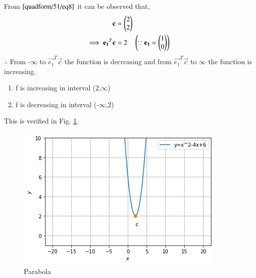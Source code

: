 From $\eqref{quadform/51/eq8}$ it can be observed that,
\begin{align}
\mathbf{c} &= \begin{pmatrix}2 \\ 2\end{pmatrix}
\\
\implies \mathbf{e_1}^T\mathbf{c}&=2  \quad\left(\because\mathbf{e_1}=\begin{pmatrix}1\\0\end{pmatrix}\right)
\end{align}
$\therefore$ From -$\infty$ to $\vec{e_1}^T\vec{c}$ the function is decreasing and from $\vec{e_1}^T\vec{c}$ to $\infty$ the function is increasing.
\begin{enumerate}
\item f is increasing in interval (2,$\infty$)
\item f is decreasing in interval (-$\infty$,2)
\end{enumerate}

This is verified in Fig.     \ref{quadform/51/fig:Prarabola}.
%
\begin{figure}[ht]
    \centering
    \includegraphics[width=\columnwidth]{solutions/su2021/2/51/Figure.png}
    \caption{Parabola}
    \label{quadform/51/fig:Prarabola}
\end{figure}    
